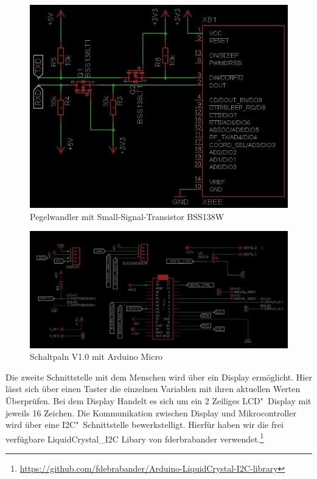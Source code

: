 \begin{figure}
	\centering
	\includegraphics[width=0.9\linewidth]{bilder/v1SchaltplanXbee.jpg}
	\caption{Pegelwandler mit Small-Signal-Transistor BSS138W }
	\label{fig-Pegel}
\end{figure}

\begin{figure}[t]
	\centering
	\includegraphics[width=0.85\linewidth]{bilder/v1SchaltplanMicro0.JPG}
	\caption{Schaltpaln V1.0 mit Arduino Micro}
	\label{fig-Schaltplanv1.0}
\end{figure}

		
Die zweite Schnittstelle mit dem Menschen wird über ein Display ermöglicht. 
Hier lässt sich über einen Taster die einzelnen Variablen mit ihren aktuellen Werten Überprüfen. 
Bei dem Display Handelt es sich um ein 2 Zeiliges LCD"~Display mit jeweils 16 Zeichen. 
Die Kommunikation zwischen Display und Mikrocontroller wird über eine I2C"~Schnittstelle bewerkstelligt. 
Hierfür haben wir die frei verfügbare \mbox{LiquidCrystal\_I2C} Libary von fderbrabander verwendet.\footnote{\href{https://github.com/fdebrabander/Arduino-LiquidCrystal-I2C-library}{https://github.com/fdebrabander/Arduino-LiquidCrystal-I2C-library}}


